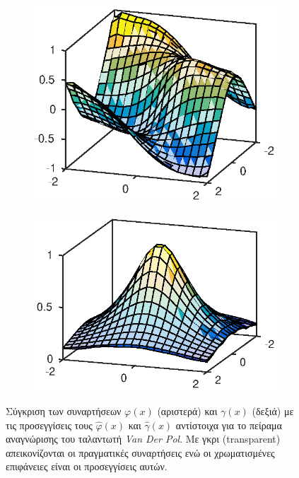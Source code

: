 {\begin{figure}
	\begin{subfigure}{0.5\textwidth}
		\includegraphics{plots/experiments/vdp/phi_hat.eps}
	\end{subfigure}
	\begin{subfigure}{0.5\textwidth}
		\includegraphics{plots/experiments/vdp/gamma_hat.eps}
	\end{subfigure}
	\caption{Σύγκριση των συναρτήσεων $\varphi(x)$ (αριστερά) και $\gamma(x)$ (δεξιά) με τις προσεγγίσεις τους $\hat{\varphi}(x)$ και $\hat{\gamma}(x)$ αντίστοιχα για το πείραμα αναγνώρισης του ταλαντωτή \textit{Van Der Pol}. Με γκρι (transparent) απεικονίζονται οι πραγματικές συναρτήσεις ενώ οι χρωματισμένες επιφάνειες είναι οι προσεγγίσεις αυτών. }
	\label{fig:vdp_approximations}
\end{figure}

}

